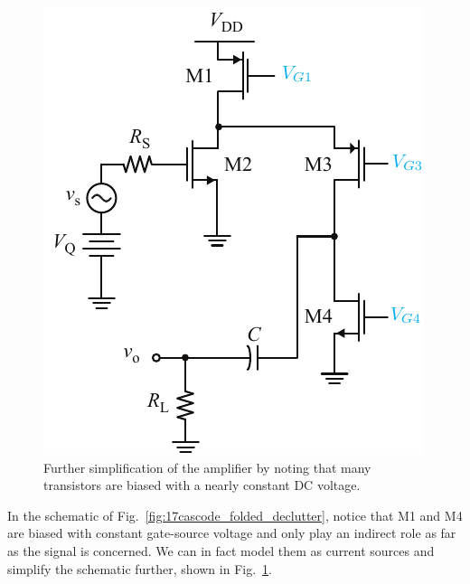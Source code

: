 \begin{figure}[tb]
\begin{center}
\includegraphics[scale=1]{18cascode_folded_dc}
\end{center}
\caption{Further simplification of the amplifier by noting that many transistors are biased with a nearly constant DC voltage.} \label{fig:18cascode_folded_dc}
\end{figure}


In the schematic of Fig.~\ref{fig:17cascode_folded_declutter}, notice that M1 and M4 are biased with constant gate-source voltage and only play an indirect role as far as the signal is concerned.  We can in fact model them as current sources and simplify the schematic further, shown in Fig.~\ref{fig:18cascode_folded_dc}.


